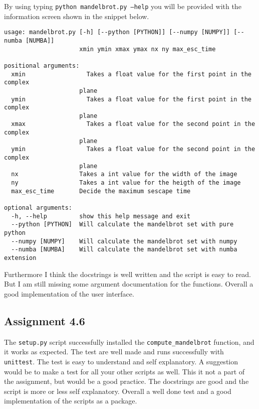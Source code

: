 \documentclass[a4paper]{article}
\begin{document}
By using typing \texttt{python mandelbrot.py --help} you will be provided with the information screen shown in the snippet below.

\begin{verbatim}
usage: mandelbrot.py [-h] [--python [PYTHON]] [--numpy [NUMPY]] [--numba [NUMBA]]
                     xmin ymin xmax ymax nx ny max_esc_time

positional arguments:
  xmin                 Takes a float value for the first point in the complex
                     plane
  ymin                 Takes a float value for the first point in the complex
                     plane
  xmax                 Takes a float value for the second point in the complex
                     plane
  ymin                 Takes a float value for the second point in the complex
                     plane
  nx                 Takes a int value for the width of the image
  ny                 Takes a int value for the heigth of the image
  max_esc_time       Decide the maximum sescape time

optional arguments:
  -h, --help         show this help message and exit
  --python [PYTHON]  Will calculate the mandelbrot set with pure python
  --numpy [NUMPY]    Will calculate the mandelbrot set with numpy
  --numba [NUMBA]    Will calculate the mandelbrot set with numba extension

\end{verbatim}

\newline\newline
\noindent Furthermore I think the docstrings is well written and the script is easy to read. But I am still missing some argument documentation for the functions.
\newline\newline
Overall a good implementation of the user interface.


\subsection*{Assignment 4.6}
The \texttt{setup.py} script successfully installed the \texttt{compute\_mandelbrot} function, and it works as expected.
\newline\newline
The test are well made and runs successfully with \texttt{unittest}. The test is easy to understand and self explanatory. A suggestion would be to make a test for all your other scripts as well. This it not a part of the assignment, but would be a good practice.
\newline\newline
The docstrings are good and the script is more or less self explanatory. 
\newline\newline
Overall a well done test and a good implementation of the scripts as a package.
\end{document}

